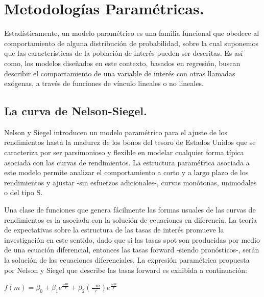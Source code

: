 \section{Metodolog\'ias Param\'etricas.}

\hspace*{0.4 cm} Estad\'isticamente, un modelo param\'etrico es una familia funcional que
obedece al comportamiento de alguna distribuci\'on de probabilidad, sobre la cual suponemos que las caracter\'isticas de la poblaci\'on de inter\'es
pueden ser descritas. Es as\'i como, los modelos dise\~nados en este contexto,
basados en regresi\'on, buscan describir el comportamiento de una
variable de inter\'es con otras llamadas ex\'ogenas, a trav\'es de funciones de
v\'inculo lineales o no lineales.

\subsection{La curva de Nelson-Siegel.\\} 

\hspace*{0.4 cm} Nelson y Siegel \cite{NS} introducen un modelo param\'etrico para el ajuste
de los rendimientos hasta la madurez de los bonos del tesoro de Estados
Unidos que se caracteriza por ser parsimonioso y flexible en modelar
cualquier forma t\'ipica asociada con las curvas de rendimientos. La estructura
param\'etrica asociada a este modelo permite analizar el comportamiento
a corto y a largo plazo de los rendimientos y ajustar -sin
esfuerzos adicionales-, curvas mon\'otonas, unimodales o del tipo S.


\hspace*{0.4 cm} Una clase de funciones que genera f\'acilmente las formas usuales de las
curvas de rendimientos es la asociada con la soluci\'on de ecuaciones en
diferencia. La teor\'ia de expectativas sobre la estructura de las tasas de
inter\'es promueve la investigaci\'on en este sentido, dado que si las tasas
spot son producidas por medio de una ecuaci\'on diferencial, entonces las
tasas forward -siendo pron\'osticos-, ser\'an la soluci\'on de las ecuaciones
diferenciales. La expresi\'on param\'etrica propuesta por Nelson y Siegel
\cite{NS} que describe las tasas forward es exhibida a continuaci\'on:


\begin{center}
$\displaystyle{f(m) = \beta_{0} + \beta_{1} e^{\frac{-m}{\tau}} +\beta_{2} \left(\frac{-m}{\tau}\right)e^{\frac{-m}{\tau}}}$
\end{center}

